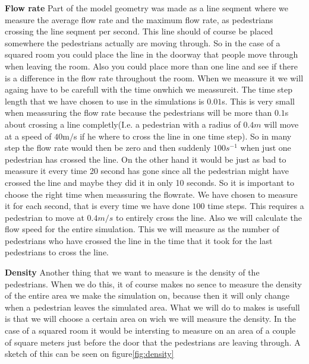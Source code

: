 \textbf{Flow rate}
Part of the model geometry was made as a line seqment where we measure the average flow 
rate and the maximum flow rate, as pedestrians crossing the line seqment per second. 
This line should of course be placed somewhere the pedestrians actually are moving through. 
So in the case of a squared room you could place the line in the doorway that people move 
through when leaving the room. Also you could place more than one line and see if there is 
a difference in the flow rate throughout the room.   When we meassure it we will againg have 
to be carefull with the time onwhich we meassureit. The time step length that we have chosen 
to use in the simulations is $0.01$s. This is very small when meassuring the flow rate because 
the pedestrians will be more than $0.1$s about crossing a line completly(I.e. a pedestrian 
with a radius of $0.4m$ will move at a speed of $40$m$/$s if he where to cross the line in 
one time step). So in many step the flow rate would then be zero and then suddenly $100 s^{-1}$ 
when just one pedestrian has crossed the line. On the other hand it would be just as bad to 
meassure it every time 20 second has gone since all the pedestrian might have crossed the 
line and maybe they did it in only 10 seconds. So it is important to choose the right time 
when meassuring the flowrate. We have chosen to measure it for each second, that is every 
time we have done $100$ time steps. This requires a pedestrian to move at $0.4m/s$ to 
entirely cross the line. Also we will calculate the flow speed for the entire simulation. 
This we will measure as the number of pedestrians who have crossed the line in the time 
that it took for the last pedestrians to cross the line.      
	
\textbf{Density}
Another thing that we want to measure is the density of the pedestrians. When we do this, 
it of course makes no sence to measure the density of the entire area we make the simulation 
on, because then it will only change when a pedestrian leaves the simulated area. What we will 
do to makes is usefull is that we will choose a certain area on wich we will measure the density. 
In the case of a squared room it would be intersting to measure on an area of a couple of square 
meters just before the door that the pedestrians are leaving through. A sketch of this can be seen 
on figure\ref{fig:density}   
	
